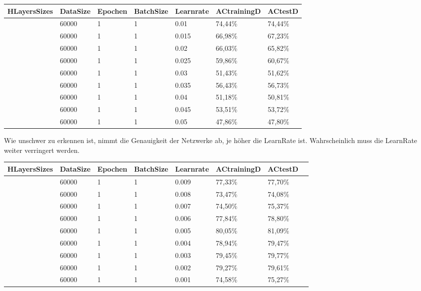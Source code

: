 \documentclass[12pt]{article}
\begin{document}
\begin{table}[H]
    \centering
    \begin{tabular}{|l|l|l|l|l|l|l|}
    \hline
        HLayersSizes & DataSize & Epochen & BatchSize & Learnrate & ACtrainingD & ACtestD \\ \hline
        [780, 100, 10] & 60000 & 1 & 1 & 0.01 & 74,44\% & 74,44\% \\ \hline
        [780, 100, 10] & 60000 & 1 & 1 & 0.015 & 66,98\% & 67,23\% \\ \hline
        [780, 100, 10] & 60000 & 1 & 1 & 0.02 & 66,03\% & 65,82\% \\ \hline
        [780, 100, 10] & 60000 & 1 & 1 & 0.025 & 59,86\% & 60,67\% \\ \hline
        [780, 100, 10] & 60000 & 1 & 1 & 0.03 & 51,43\% & 51,62\% \\ \hline
        [780, 100, 10] & 60000 & 1 & 1 & 0.035 & 56,43\% & 56,73\% \\ \hline
        [780, 100, 10] & 60000 & 1 & 1 & 0.04 & 51,18\% & 50,81\% \\ \hline
        [780, 100, 10] & 60000 & 1 & 1 & 0.045 & 53,51\% & 53,72\% \\ \hline
        [780, 100, 10] & 60000 & 1 & 1 & 0.05 & 47,86\% & 47,80\% \\ \hline
    \end{tabular}
\end{table}
	Wie unschwer zu erkennen ist, nimmt die Genauigkeit der Netzwerke ab, je höher die LearnRate ist. Wahrscheinlich muss die LearnRate weiter verringert werden.
\begin{table}[H]
    \centering
    \begin{tabular}{|l|l|l|l|l|l|l|l|}
    \hline
        HLayersSizes & DataSize & Epochen & BatchSize & Learnrate & ACtrainingD & ACtestD\\ \hline
        [780, 100, 10] & 60000 & 1 & 1 & 0.009 & 77,33\% & 77,70\%  \\ \hline
        [780, 100, 10] & 60000 & 1 & 1 & 0.008 & 73,47\% & 74,08\% \\ \hline
        [780, 100, 10] & 60000 & 1 & 1 & 0.007 & 74,50\% & 75,37\% \\ \hline
        [780, 100, 10] & 60000 & 1 & 1 & 0.006 & 77,84\% & 78,80\% \\ \hline
        [780, 100, 10] & 60000 & 1 & 1 & 0.005 & 80,05\% & 81,09\%  \\ \hline
        [780, 100, 10] & 60000 & 1 & 1 & 0.004 & 78,94\% & 79,47\%  \\ \hline
        [780, 100, 10] & 60000 & 1 & 1 & 0.003 & 79,45\% & 79,77\%  \\ \hline
        [780, 100, 10] & 60000 & 1 & 1 & 0.002 & 79,27\% & 79,61\%  \\ \hline
        [780, 100, 10] & 60000 & 1 & 1 & 0.001 & 74,58\% & 75,27\%  \\ \hline
    \end{tabular}
\end{table}
\end{document}
